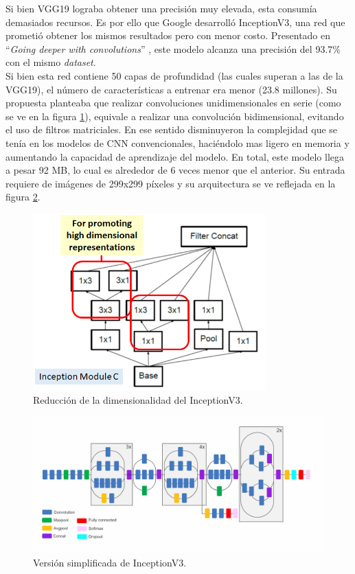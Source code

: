 Si bien VGG19 lograba obtener una precisión muy elevada, esta consumía demasiados 
recursos. Es por ello que Google desarrolló InceptionV3, una red que prometió obtener los 
mismos resultados pero con menor costo. Presentado en ``\textit{Going deeper with convolutions}'' 
\cite{Szegedy2014}, este modelo alcanza una precisión del 93.7\% con el mismo \textit{dataset}. 
\\
Si bien esta red contiene 50 capas de profundidad (las cuales superan a las de la VGG19), el 
número de características a entrenar era menor (23.8 millones). Su propuesta planteaba que
realizar convoluciones unidimensionales en serie (como se ve en la figura \ref{InceptionLayer}), 
equivale a realizar una convolución bidimensional, evitando el uso de filtros matriciales. 
En ese sentido disminuyeron la complejidad que se tenía en los modelos de CNN convencionales, 
haciéndolo mas ligero en memoria y aumentando la capacidad de aprendizaje del modelo. En total, 
este modelo llega a pesar 92 MB, lo cual es alrededor de 6 veces menor que el anterior. Su 
entrada requiere de imágenes de 299x299 píxeles y su arquitectura se ve reflejada en la figura 
\ref{Inceptionv3}.

\begin{figure}[h!]
\includegraphics[width=0.8\textwidth]{images/InceptionLayer.png}
\centering
\caption{Reducción de la dimensionalidad del InceptionV3. \cite{modelos} }
\label{InceptionLayer}
\end{figure}

\begin{figure}[h!]
\includegraphics[width=1\textwidth]{images/InceptionV3.png}
\centering
\caption{Versión simplificada de InceptionV3. \cite{modelos} }
\label{Inceptionv3}
\end{figure}

